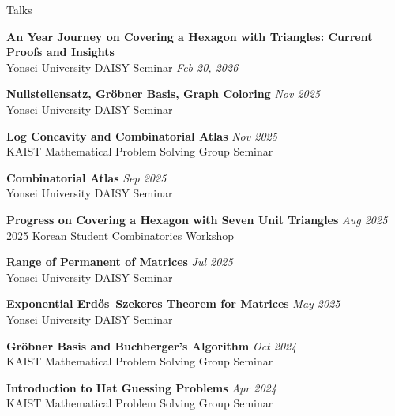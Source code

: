 \documentclass{resume}
\begin{document}
\begin{rSection}{Talks}

\textbf{An Year Journey on Covering a Hexagon with Triangles: Current Proofs and Insights}\\
Yonsei University DAISY Seminar \hfill \textit{Feb 20, 2026}

\textbf{Nullstellensatz, Gröbner Basis, Graph Coloring} \hfill \textit{Nov 2025}\\
Yonsei University DAISY Seminar

\textbf{Log Concavity and Combinatorial Atlas} \hfill \textit{Nov 2025}\\
KAIST Mathematical Problem Solving Group Seminar

\textbf{Combinatorial Atlas} \hfill \textit{Sep 2025}\\
Yonsei University DAISY Seminar

\textbf{Progress on Covering a Hexagon with Seven Unit Triangles} \hfill \textit{Aug 2025}\\
2025 Korean Student Combinatorics Workshop

\textbf{Range of Permanent of Matrices} \hfill \textit{Jul 2025}\\
Yonsei University DAISY Seminar

\textbf{Exponential Erd\H{o}s--Szekeres Theorem for Matrices} \hfill \textit{May 2025}\\
Yonsei University DAISY Seminar

\textbf{Gröbner Basis and Buchberger's Algorithm} \hfill \textit{Oct 2024}\\
KAIST Mathematical Problem Solving Group Seminar

\textbf{Introduction to Hat Guessing Problems} \hfill \textit{Apr 2024}\\
KAIST Mathematical Problem Solving Group Seminar

\end{rSection}
\end{document}
